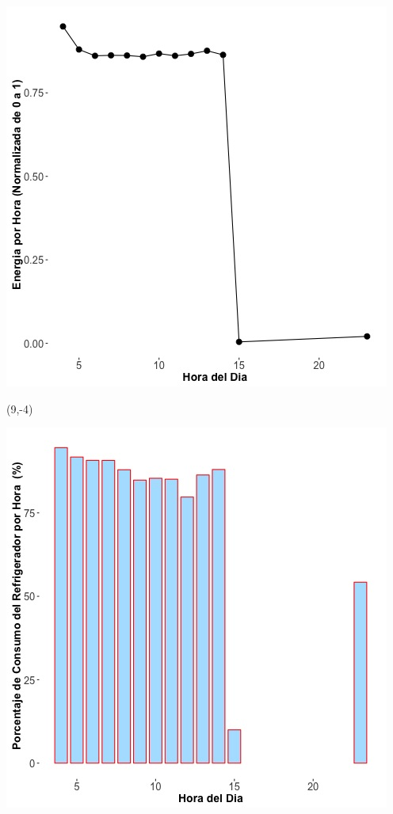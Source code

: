 \documentclass{article}\usepackage[]{graphicx}\usepackage[]{color}
\newenvironment{knitrout}{}{} %
\begin{document}
\begin{knitrout}
\color{fgcolor}
\includegraphics[scale=0.75]{figure/A14_fplot_norm_median} 
\end{knitrout}


 \begin{textblock}{1}(9,-4)
\begin{minipage}{20em}
\begingroup

\endgroup
\end{minipage}
\end{textblock}

 \vspace{2cm}

\begin{knitrout}
\color{fgcolor}
\includegraphics[scale=0.65]{figure/A14_fridge_energy_pct.jpg} 
\end{knitrout}
\end{document}
